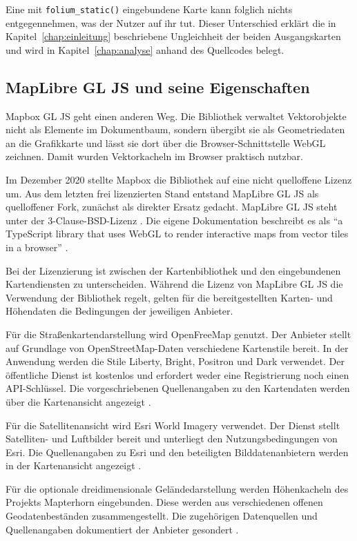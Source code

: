 \documentclass[12pt,a4paper]{report}
\begin{document}
Eine mit \texttt{folium\_static()} eingebundene Karte kann folglich nichts entgegennehmen,
was der Nutzer auf ihr tut. Dieser Unterschied erklärt die in
Kapitel~\ref{chap:einleitung} beschriebene Ungleichheit der beiden Ausgangskarten und wird
in Kapitel~\ref{chap:analyse} anhand des Quellcodes belegt.

\subsection{MapLibre GL JS und seine Eigenschaften}
\label{subsec:maplibre}

Mapbox GL JS geht einen anderen Weg. Die Bibliothek verwaltet Vektorobjekte nicht als
Elemente im Dokumentbaum, sondern übergibt sie als Geometriedaten an die Grafikkarte und
lässt sie dort über die Browser-Schnittstelle WebGL zeichnen. Damit wurden Vektorkacheln
im Browser praktisch nutzbar.

Im Dezember 2020 stellte Mapbox die Bibliothek auf eine nicht quelloffene Lizenz um. Aus
dem letzten frei lizenzierten Stand entstand MapLibre GL JS als quelloffener Fork, zunächst
als direkter Ersatz gedacht. MapLibre GL JS steht unter der 3-Clause-BSD-Lizenz
\cite{MapLibreRepo}. Die eigene Dokumentation beschreibt es als \enquote{a TypeScript
library that uses WebGL to render interactive maps from vector tiles in a browser}
\cite{MapLibreDocs}.


Bei der Lizenzierung ist zwischen der
Kartenbibliothek und den eingebundenen
Kartendiensten zu unterscheiden. Während die
Lizenz von MapLibre GL JS die Verwendung der
Bibliothek regelt, gelten für die bereitgestellten
Karten- und Höhendaten die Bedingungen der
jeweiligen Anbieter.

Für die Straßenkartendarstellung wird OpenFreeMap genutzt.
Der Anbieter stellt auf Grundlage von OpenStreetMap-Daten
verschiedene Kartenstile bereit. In der Anwendung werden
die Stile Liberty, Bright, Positron und Dark verwendet.
Der öffentliche Dienst ist kostenlos und erfordert weder
eine Registrierung noch einen API-Schlüssel.
Die vorgeschriebenen Quellenangaben zu den Kartendaten
werden über die Kartenansicht angezeigt
\cite{OpenFreeMap}.

Für die Satellitenansicht wird Esri World Imagery
verwendet. Der Dienst stellt Satelliten- und Luftbilder
bereit und unterliegt den Nutzungsbedingungen von Esri.
Die Quellenangaben zu Esri und den beteiligten
Bilddatenanbietern werden in der Kartenansicht angezeigt
\cite{EsriTerms}.

Für die optionale dreidimensionale Geländedarstellung werden
Höhenkacheln des Projekts Mapterhorn eingebunden. Diese
werden aus verschiedenen offenen Geodatenbeständen
zusammengestellt. Die zugehörigen Datenquellen und
Quellenangaben dokumentiert der Anbieter gesondert
\cite{MapterhornAttribution}.
\end{document}
